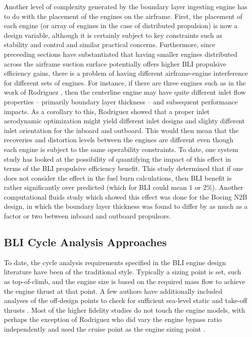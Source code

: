 		\indent Another level of complexity generated by the boundary layer ingesting engine has to do with the placement of the engines on the airframe.  First, the placement of each engine (or array of engines in the case of distributed propulsion) is now a design variable, although it is certainly subject to key constraints such as stability and control and similar practical concerns.  Furthermore, since preceeding sections have substantiated that having smaller engines distributed across the airframe suction surface potentially offers higher BLI propulsive efficiency gains, there is a problem of having different airframe-engine interference for different sets of engines.  For instance, if there are three engines such as in the work of Rodriguez \cite{RodriguezThesis}, then the centerline engine may have quite different inlet flow properties -- primarily boundary layer thickness -- and subsequent performance impacts.  As a corollary to this, Rodriguez showed that a proper inlet aerodynamic optimization might yield different inlet designs and slighty different inlet orientation for the inboard and outboard.  This would then mean that the recoveries and distortion levels between the engines are different even though each engine is subject to the same operability constraints.  To date, one system study has looked at the possibility of quantifying the impact of this \cite{Sato2011} effect in terms of the BLI propulsive efficiency benefit.  This study determined that if one does not consider the effect in the fuel burn calculations, then BLI benefit is rather significantly over predicted (which for BLI could mean 1 or 2\%).  Another computational fluids study \cite{Kim2012} which showed this effect was done for the Boeing N2B design, in which the boundary layer thickness was found to differ by as much as a factor or two between inboard and outboard propulsors.
		
		\subsection{BLI Cycle Analysis Approaches}
		\indent To date, the cycle analysis requirements specified in the BLI engine design literature have been of the traditional style.  Typically a sizing point is set, such as top-of-climb, and the engine size is based on the required mass flow to achieve the engine thrust at that point.  A few authors have additionally included analyses of the off-design points to check for sufficient sea-level static and take-off thrusts \cite{Felder2011} \cite{Sato2011}.  Most of the higher fidelity studies do not touch the engine models, with perhaps the exception of Rodriguez who did vary the engine bypass ratio independently and used the cruise point as the engine sizing point \cite{RodriguezThesis} \cite{Rodriguez2009}.			
		
